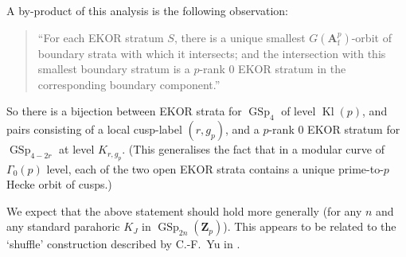 \documentclass[cjm]{ipart}
\theoremstyle{plain}
\theoremstyle{remark}
\DeclareMathOperator{\GSp}{GSp}
\DeclareMathOperator{\Kl}{Kl}
\newcommand{\Af}{\AA_{\mathrm{f}}}
\newcommand{\Zp}{\mathbf{Z}_p}
\newcommand{\et}{\text{\textup{\'et}}}
\renewcommand{\AA}{\mathbf{A}}
\numberwithin{equation}{subsection}
\begin{document}
\begin{figure}
\end{figure}



 \begin{remark}
  A by-product of this analysis is the following observation:

  \begin{quotation}
   ``For each EKOR stratum $S$, there is a unique smallest $G(\Af^p)$-orbit of boundary strata with which it intersects; and the intersection with this smallest boundary stratum is a $p$-rank 0 EKOR stratum in the corresponding boundary component.''
  \end{quotation}

  So there is a bijection between EKOR strata for $\GSp_4$ of level $\Kl(p)$, and pairs consisting of a local cusp-label $(r, g_p)$, and a $p$-rank 0 EKOR stratum for $\GSp_{4-2r}$ at level $K_{r, g_p}$. (This generalises the fact that in a modular curve of $\Gamma_0(p)$ level, each of the two open EKOR strata contains a unique prime-to-$p$ Hecke orbit of cusps.)

  We expect that the above statement should hold more generally (for any $n$ and any standard parahoric $K_J$ in $\GSp_{2n}(\Zp)$). This appears to be related to the `shuffle' construction described by C.-F.~Yu in \cite{yu10}.
 \end{remark}
\end{document}
